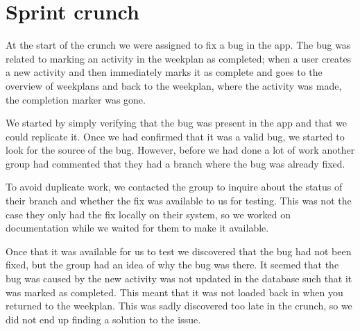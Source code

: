 \section{Sprint crunch}
At the start of the crunch we were assigned to fix a bug in the app.
The bug was related to marking an activity in the weekplan as completed; when a user creates a new activity and then immediately marks it as complete and goes to the overview of weekplans and back to the weekplan, where the activity was made, the completion marker was gone.

We started by simply verifying that the bug was present in the app and that we could replicate it.
Once we had confirmed that it was a valid bug, we started to look for the source of the bug. 
However, before we had done a lot of work another group had commented that they had a branch where the bug was already fixed.

To avoid duplicate work, we contacted the group to inquire about the status of their branch and whether the fix was available to us for testing.
This was not the case they only had the fix locally on their system, so we worked on documentation while we waited for them to make it available.

Once that it was available for us to test we discovered that the bug had not been fixed, but the group had an idea of why the bug was there.
It seemed that the bug was caused by the new activity was not updated in the database such that it was marked as completed.
This meant that it was not loaded back in when you returned to the weekplan. 
This was sadly discovered too late in the crunch, so we did not end up finding a solution to the issue.

